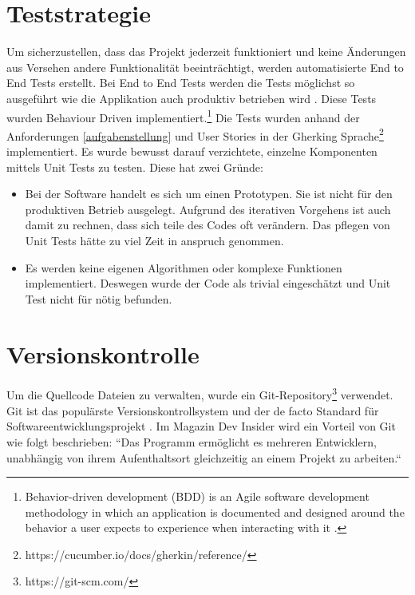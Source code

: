 \section{Teststrategie}
\label{teststrategie}

Um sicherzustellen, dass das Projekt jederzeit funktioniert und keine Änderungen
aus Versehen andere Funktionalität beeinträchtigt, werden automatisierte
End to End Tests erstellt. Bei End to End Tests werden die Tests möglichst
so ausgeführt wie die Applikation auch produktiv betrieben wird \parencite{georgian_2021}.
Diese Tests wurden Behaviour Driven implementiert.\footnote{
      Behavior-driven development (BDD) is an Agile software development methodology
      in which an application is documented and designed around the behavior a user
      expects to experience when interacting with it \parencite{what_is_bdd}.
}  Die Tests wurden anhand der Anforderungen \ref{aufgabenstellung}
und User Stories in der Gherking Sprache\footnote{https://cucumber.io/docs/gherkin/reference/} implementiert.
Es wurde bewusst darauf verzichtete, einzelne Komponenten mittels Unit Tests zu testen.
Diese hat zwei Gründe:
\begin{itemize}
      \item Bei der Software handelt es sich um einen Prototypen.
            Sie ist nicht für den produktiven Betrieb ausgelegt.
            Aufgrund des iterativen Vorgehens ist auch damit zu rechnen, dass sich teile des Codes oft verändern.
            Das pflegen von Unit Tests hätte zu viel Zeit in anspruch genommen.
      \item Es werden keine eigenen Algorithmen oder komplexe Funktionen implementiert.
            Deswegen wurde der Code als trivial eingeschätzt und Unit Test nicht für nötig befunden.
\end{itemize}



\section{Versionskontrolle}

Um die Quellcode Dateien zu verwalten, wurde ein Git-Repository\footnote{https://git-scm.com/} verwendet.
Git ist das populärste Versionskontrollsystem und der de facto Standard für Softwareentwicklungsprojekt \parencite{git}.
Im Magazin Dev Insider  wird ein Vorteil von Git wie folgt beschrieben:
``Das Programm ermöglicht es mehreren Entwicklern, unabhängig von ihrem Aufenthaltsort gleichzeitig an einem Projekt zu arbeiten.`` \cite{was_ist_git}

